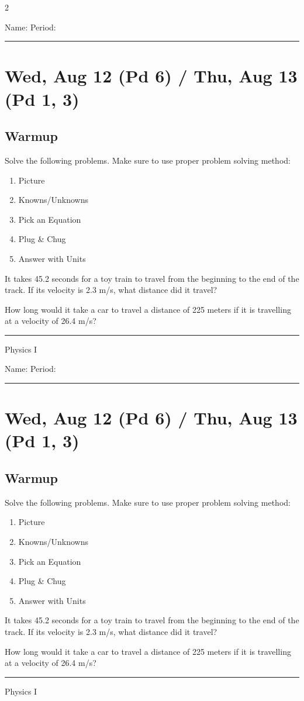 \documentclass[10pt,landscape]{exam}
\def\todayDate{Wed, Aug 12 (Pd 6) / Thu, Aug 13 (Pd 1, 3)}
\def\content{

  \begin{Sbox}\begin{minipage}{4.5in}
    Solve the following problems.  Make sure to use proper problem solving method:
    \begin{enumerate}
      \item Picture
      \item Knowns/Unknowns
      \item Pick an Equation
      \item Plug \& Chug
      \item Answer with Units
    \end{enumerate}

  \end{minipage}\end{Sbox}

  \noindent
  \shadowbox{\TheSbox}



  \begin{questions}

    \question It takes 45.2 seconds for a toy train to travel from the beginning to the end of the track.  If its velocity is 2.3 m/s, what distance did it travel? \vs

    \question How long would it take a car to travel a distance of 225 meters if it is travelling at a velocity of 26.4 m/s?
    
  \end{questions}


}
\begin{document}
\pagestyle{empty}

\setlength{\columnsep}{0.8in}
\begin{multicols*}{2}

\noindent  
Name: \hfill Period: \hspace{5em}
\vspace{0.5em}
\hrule

\section*{\todayDate}
\subsection*{Warmup}

\content

\vfill
\hrule
\vspace{0.5em}
\hfill {\sc Physics I}

\columnbreak

\noindent  
Name: \hfill Period: \hspace{5em}
\vspace{0.5em}
\hrule

\section*{\todayDate}
\subsection*{Warmup}

\content

\vfill
\hrule
\vspace{0.5em}
\hfill {\sc Physics I}

\end{multicols*}
\end{document}
